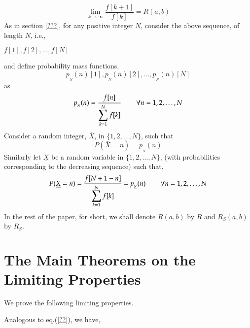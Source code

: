\begin{multicols}{2}
\begin{equation}
\lim_{k \rightarrow \infty} \frac{f[k+1]}{f[k]} = R(a,b)\label{eq-3.5}
\end{equation}
As in section \ref{???}, for any positive integer $N$, consider the above sequence, of length $N$, i.e.,
\begin{center}
$f[1],f[2], \ldots, f[N]$
\end{center} 
and define probability mass functions,
$$
p_{_{\bar{N}}}(n)[1],p_{_{\bar{N}}}(n)[2], \ldots, p_{_{\bar{N}}}(n)[N]
$$
as
\begin{equation}
 p_{_{\bar{N}}}(n) = \frac{f[n]}{\displaystyle{\sum_{k =1}^N f[k]}} \hspace{0.3in} \forall n = 1, 2, \ldots, N\label{eq-3.6}
\end{equation}
Consider a random integer, $\bar{X}$, in $\{1,2, \ldots, N\}$, such that
\begin{equation}
P(\bar{X} = n) = p_{_{\bar{N}}}(n)\label{eq-3.7}
\end{equation} 
Similarly let $\underline{X}$ be a random variable in $\{1,2, \ldots, N\}$, (with probabilities corresponding to the decreasing sequence) such that, 
\begin{equation}
P(\underline{X} = n) = \frac{f[N+1-n]}{\displaystyle{\sum_{k =1}^N f[k]}} = p_{_{\underline{N}}}(n) \hspace{0.3in} \forall n = 1, 2, \ldots, N\label{eq-3.8}
\end{equation} 
 In the rest of the paper, for short, we shall denote $R(a,b)$ by $R$ and $R_S(a,b)$ by $R_S$.
 
\section{The Main Theorems on the Limiting Properties}\label{section-4} 

We prove the following limiting properties.

Analogous to eq.(\ref{??}), we have,


\end{multicols}
